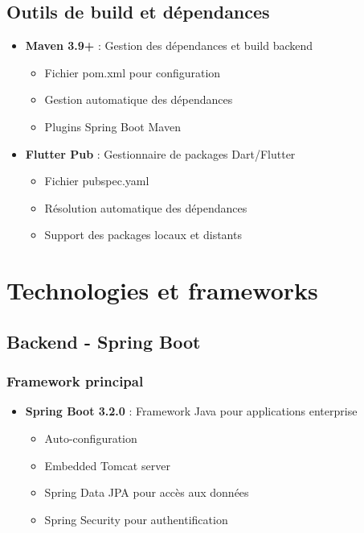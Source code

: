 \documentclass[a4paper,11pt]{report}
\begin{document}
\subsection{Outils de build et dépendances}

\begin{itemize}
    \item \textbf{Maven 3.9+} : Gestion des dépendances et build backend
    \begin{itemize}
        \item Fichier pom.xml pour configuration
        \item Gestion automatique des dépendances
        \item Plugins Spring Boot Maven
    \end{itemize}
    
    \item \textbf{Flutter Pub} : Gestionnaire de packages Dart/Flutter
    \begin{itemize}
        \item Fichier pubspec.yaml
        \item Résolution automatique des dépendances
        \item Support des packages locaux et distants
    \end{itemize}
\end{itemize}

\section{Technologies et frameworks}

\subsection{Backend - Spring Boot}

\subsubsection{Framework principal}

\begin{itemize}
    \item \textbf{Spring Boot 3.2.0} : Framework Java pour applications enterprise
    \begin{itemize}
        \item Auto-configuration
        \item Embedded Tomcat server
        \item Spring Data JPA pour accès aux données
        \item Spring Security pour authentification
    \end{itemize}
\end{itemize}
\end{document}
